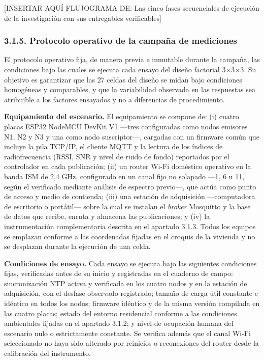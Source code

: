 \documentclass[
  12pt,
]{article}
\begin{document}
{[}INSERTAR AQUÍ FLUJOGRAMA DE: Las cinco fases secuenciales de
ejecución de la investigación con sus entregables verificables{]}

\subsubsection{3.1.5. Protocolo operativo de la campaña de
mediciones}\label{protocolo-operativo-de-la-campauxf1a-de-mediciones}

El protocolo operativo fija, de manera previa e inmutable durante la
campaña, las condiciones bajo las cuales se ejecuta cada ensayo del
diseño factorial 3×3×3. Su objetivo es garantizar que las 27 celdas del
diseño se midan bajo condiciones homogéneas y comparables, y que la
variabilidad observada en las respuestas sea atribuible a los factores
ensayados y no a diferencias de procedimiento.

\textbf{Equipamiento del escenario.} El equipamiento se compone de: (i)
cuatro placas ESP32 NodeMCU DevKit V1 —tres configuradas como nodos
emisores N1, N2 y N3 y una como nodo suscriptor—, cargadas con un
firmware común que incluye la pila TCP/IP, el cliente MQTT y la lectura
de los índices de radiofrecuencia (RSSI, SNR y nivel de ruido de fondo)
reportados por el controlador en cada publicación; (ii) un router Wi-Fi
doméstico operativo en la banda ISM de 2,4 GHz, configurado en un canal
fijo no solapado —1, 6 u 11, según el verificado mediante análisis de
espectro previo—, que actúa como punto de acceso y medio de contienda;
(iii) una estación de adquisición —computadora de escritorio o portátil—
sobre la cual se instalan el \emph{broker} Mosquitto y la base de datos
que recibe, enruta y almacena las publicaciones; y (iv) la
instrumentación complementaria descrita en el apartado 3.1.3. Todos los
equipos se emplazan conforme a las coordenadas fijadas en el croquis de
la vivienda y no se desplazan durante la ejecución de una celda.

\textbf{Condiciones de ensayo.} Cada ensayo se ejecuta bajo las
siguientes condiciones fijas, verificadas antes de su inicio y
registradas en el cuaderno de campo: sincronización NTP activa y
verificada en los cuatro nodos y en la estación de adquisición, con el
desfase observado registrado; tamaño de carga útil constante e idéntico
en todos los nodos; firmware idéntico y de la misma versión compilada en
las cuatro placas; estado del entorno residencial conforme a las
condiciones ambientales fijadas en el apartado 3.1.2; y nivel de
ocupación humana del escenario nulo o estrictamente constante. Se
verifica además que el canal Wi-Fi seleccionado no haya sido alterado
por reinicios o reconexiones del router desde la calibración del
instrumento.
\end{document}
